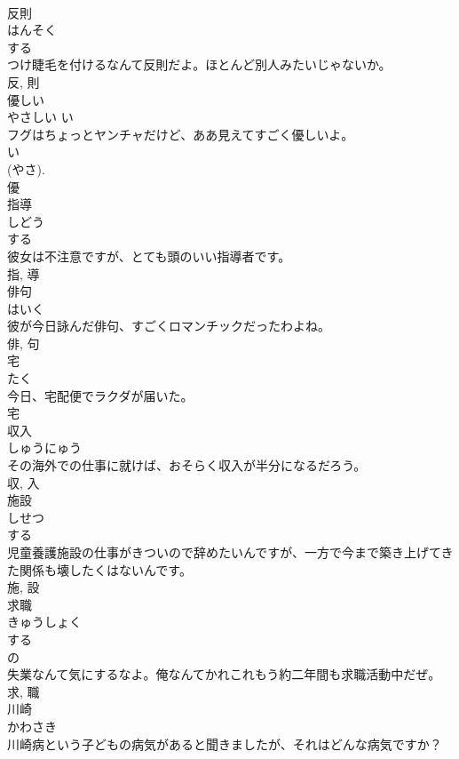 \documentclass[8pt]{extreport}
\begin{document}
\begin{CJK}{UTF8}{min}
\\	反則	
\\	はんそく	
\\	する 
\\	つけ睫毛を付けるなんて反則だよ。ほとんど別人みたいじゃないか。	
\\	反, 則	
\\	優しい	
\\	やさしい	い 
\\	フグはちょっとヤンチャだけど、ああ見えてすごく優しいよ。	
\\	い 
\\	(やさ). 
\\	優	
\\	指導	
\\	しどう	
\\	する 
\\	彼女は不注意ですが、とても頭のいい指導者です。	
\\	指, 導	
\\	俳句	
\\	はいく	
\\	彼が今日詠んだ俳句、すごくロマンチックだったわよね。	
\\	俳, 句	
\\	宅	
\\	たく	
\\	今日、宅配便でラクダが届いた。	
\\	宅	
\\	収入	
\\	しゅうにゅう	
\\	その海外での仕事に就けば、おそらく収入が半分になるだろう。	
\\	収, 入	
\\	施設	
\\	しせつ	
\\	する 
\\	児童養護施設の仕事がきついので辞めたいんですが、一方で今まで築き上げてきた関係も壊したくはないんです。	
\\	施, 設	
\\	求職	
\\	きゅうしょく	
\\	する 
\\	の 
\\	失業なんて気にするなよ。俺なんてかれこれもう約二年間も求職活動中だぜ。	
\\	求, 職	
\\	川崎	
\\	かわさき	
\\	川崎病という子どもの病気があると聞きましたが、それはどんな病気ですか？	

\end{CJK}
\end{document}
